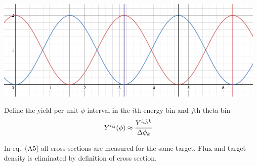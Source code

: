 \documentclass{article}
\begin{document}
\includegraphics[width=\linewidth]{assymetry.png}

Define the yield per unit $\phi$ interval in the $i$th energy bin and $j$th theta bin
$$
Y^{i,j}(\phi) \approx { Y^{i,j,k} \over \Delta\phi_k }
$$

In eq.~(A5) all cross sections are measured for the same target. Flux and target density is eliminated by definition of cross section.
\end{document}

